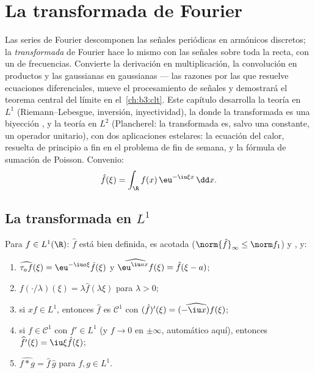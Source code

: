 \chapter{La transformada de Fourier}\label{ch:b3:fouriertransform}

Las series de Fourier descomponen las señales periódicas en armónicos
discretos; la \emph{transformada} de Fourier hace lo mismo con las
señales sobre toda la recta, con un  de frecuencias. Convierte
la derivación en multiplicación, la convolución en productos y las
gaussianas en gaussianas --- las razones por las que resuelve ecuaciones
diferenciales, mueve el procesamiento de señales y demostrará el teorema
central del límite en el~\cref{ch:b3:clt}. Este capítulo desarrolla la
teoría en $L^1$ (Riemann--Lebesgue, inversión, inyectividad), la
 donde la
transformada es una biyección ,
y la teoría en $L^2$ (Plancherel: la transformada es, salvo una
constante, un operador unitario), con dos aplicaciones estelares: la
ecuación del calor, resuelta de principio a fin en el problema de fin de
semana, y la fórmula de sumación de Poisson. Convenio:
\[
\hat f(\xi) = \int_\R f(x)\,\eu^{-\iu\xi x}\,\dd x .
\]

\section{La transformada en \texorpdfstring{$L^1$}{L1}}

\begin{proposition}\label{prop:b3:fouriertransform:basic}
Para $f \in L^1(\R)$: $\hat f$ está bien definida, es acotada
($\norm{\hat f}_\infty \leq \norm f_1$) y
, y:
\begin{enumerate}
  \item $\widehat{\tau_af}(\xi) = \eu^{-\iu a\xi}\hat f(\xi)$
        y $\widehat{\eu^{\iu ax}f}(\xi) = \hat f(\xi - a)$; \item
        $\widehat{f(\cdot/\lambda)}(\xi) = \lambda\hat
        f(\lambda\xi)$ para $\lambda > 0$; \item si $xf \in L^1$,
        entonces $\hat f$ es $\mathcal C^1$ con
        $(\hat f)'(\xi) = \widehat{(-\iu x)f}(\xi)$;
  \item si $f \in \mathcal C^1$ con $f' \in L^1$ (y $f \to
        0$ en $\pm\infty$, automático aquí), entonces
        $\widehat{f'}(\xi) = \iu\xi\hat f(\xi)$;
  \item $\widehat{f * g} = \hat f\,\hat g$ para $f, g \in L^1$.
\end{enumerate}
\end{proposition}

